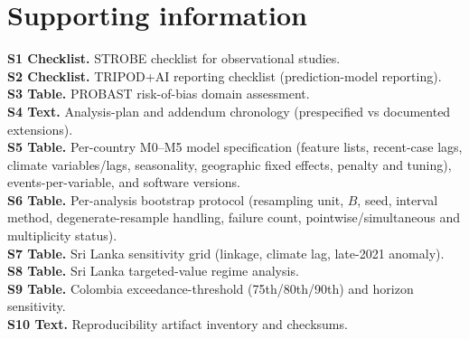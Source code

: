 \documentclass[11pt,a4paper]{article}
\begin{document}
\section*{Supporting information}
\noindent\textbf{S1 Checklist.} STROBE checklist for observational studies.\\
\textbf{S2 Checklist.} TRIPOD+AI reporting checklist (prediction-model reporting).\\
\textbf{S3 Table.} PROBAST risk-of-bias domain assessment.\\
\textbf{S4 Text.} Analysis-plan and addendum chronology (prespecified vs documented extensions).\\
\textbf{S5 Table.} Per-country M0--M5 model specification (feature lists, recent-case lags, climate variables/lags, seasonality, geographic fixed effects, penalty and tuning), events-per-variable, and software versions.\\
\textbf{S6 Table.} Per-analysis bootstrap protocol (resampling unit, $B$, seed, interval method, degenerate-resample handling, failure count, pointwise/simultaneous and multiplicity status).\\
\textbf{S7 Table.} Sri Lanka sensitivity grid (linkage, climate lag, late-2021 anomaly).\\
\textbf{S8 Table.} Sri Lanka targeted-value regime analysis.\\
\textbf{S9 Table.} Colombia exceedance-threshold (75th/80th/90th) and horizon sensitivity.\\
\textbf{S10 Text.} Reproducibility artifact inventory and checksums.



\end{document}
